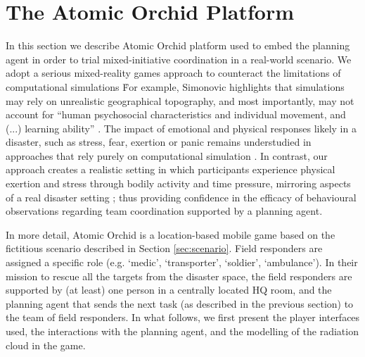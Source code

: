 \section{The Atomic Orchid Platform}\label{sec:atomicorchid}
\noindent In this section we describe Atomic Orchid platform used to embed the planning agent in order to trial mixed-initiative coordination in a real-world scenario.
We adopt a serious mixed-reality games approach to counteract the limitations of computational simulations \. For example, Simonovic highlights that simulations may rely on unrealistic geographical topography, and most importantly, may not account for ``human psychosocial characteristics and individual movement, and (...) learning ability'' \cite{simonovic:2009}. The impact of emotional and physical responses likely in a disaster, such as stress, fear, exertion or panic remains understudied in approaches that rely purely on computational simulation \cite{drury:etal:2009}. In contrast, our approach creates a realistic setting in which participants experience physical exertion and stress through bodily activity and time pressure, mirroring aspects of a real disaster setting \cite{paho:2001}; thus providing confidence in the efficacy of behavioural observations regarding team coordination supported by a planning agent.

In more detail, Atomic Orchid is a location-based mobile game based on the fictitious scenario described in Section \ref{sec:scenario}. Field responders are assigned a specific role (e.g. `medic', `transporter', `soldier', `ambulance'). In their mission to rescue all the targets from the disaster space, the field responders are supported by (at least) one person in a centrally located HQ room, and the planning agent that sends the next task (as described in the previous section) to the team of field responders. In what follows, we first present the player interfaces used, the interactions with the planning agent, and the modelling of the radiation cloud in the game.





 